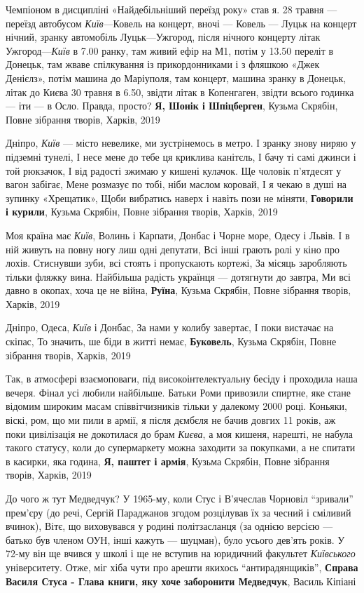 Чемпіоном в дисципліні «Найдебільніший переїзд року» став я. 28 травня —
переїзд автобусом \emph{Київ}—Ковель на концерт, вночі — Ковель — Луцьк на
концерт нічний, зранку автомобіль Луцьк—Ужгород, після нічного концерту літак
Ужгород—\emph{Київ} в 7.00 ранку, там живий ефір на М1, потім у 13.50 переліт в
Донецьк, там жваве спілкування із прикордонниками і з фляшкою «Джек Денієлз»,
потім машина до Маріуполя, там концерт, машина зранку в Донецьк, літак до Києва
30 травня в 6.50, звідти літак в Копенгаген, звідти всього годинка — іти — в
Осло. Правда, просто?  \textbf{Я, Шонік і Шпіцберген}, Кузьма Скрябін, Повне
зібрання творів, Харків, 2019

Дніпро, \emph{Київ} — місто невелике, ми зустрінемось в метро. І зранку знову
ниряю у підземні тунелі, І несе мене до тебе ця криклива канітєль, І бачу ті
самі джинси і той рюкзачок, І від радості зжимаю у кишені кулачок.  Ще чоловік
п'ятдесят у вагон забігає, Мене розмазує по тобі, ніби маслом коровай, І я
чекаю в душі на зупинку «Хрещатик», Щоби вибратись наверх і навіть пози не
міняти, \textbf{Говорили і курили}, Кузьма Скрябін, Повне зібрання творів,
Харків, 2019

Моя країна має \emph{Київ}, Волинь і Карпати, Донбас і Чорне море, Одесу і
Львів.  І в ній живуть на повну ногу лиш одні депутати, Всі інші грають ролі у
кіно про лохів.  Стиснувши зуби, всі стоять і пропускають кортежі, За місяць
заробляють тільки фляжку вина. Найбільша радість українця — дотягнути до
завтра, Ми всі давно в окопах, хоча це не війна, \textbf{Руїна}, Кузьма
Скрябін, Повне зібрання творів, Харків, 2019

Дніпро, Одеса, \emph{Київ} і Донбас, За нами у колибу завертає, І поки вистачає
на скіпас, То значить, ше біди в житті немає, \textbf{Буковель}, Кузьма
Скрябін, Повне зібрання творів, Харків, 2019

Так, в атмосфері взаємоповаги, під високоінтелектуальну бесіду і проходила наша
вечеря. Фінал усі любили найбільше. Батьки Роми привозили спиртне, яке стане
відомим широким масам співвітчизників тільки у далекому 2000 році. Коньяки,
віскі, ром, що ми пили в армії, я після дємбєля не бачив довгих 11 років, аж
поки цивілізація не докотилася до брам \emph{Києва}, а моя кишеня, нарешті, не
набула такого статусу, коли до супермаркету можна заходити за покупками, а не
спитати в касирки, яка година, \textbf{Я, паштет і армія}, Кузьма Скрябін,
Повне зібрання творів, Харків, 2019

До чого ж тут Медведчук? У 1965-му, коли Стус і В'ячеслав Чорновіл
\enquote{зривали} прем'єру (до речі, Сергій Параджанов згодом розцілував їх за
чесний і сміливий вчинок), Вітє, що виховувався у родині політзасланця (за
однією версією — батько був членом ОУН, інші кажуть — шуцман), було усього
дев'ять років.  У 72-му він ще вчився у школі і ще не вступив на юридичний
факультет \emph{Київського} університету. Отже, міг хіба чути про арешти
якихось \enquote{антирадянщиків}, \textbf{Справа Василя Стуса - Глава книги,
яку хоче заборонити Медведчук}, Василь Кіпіані

